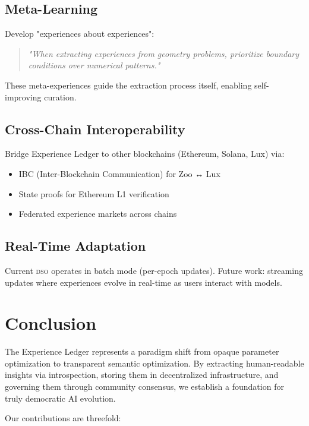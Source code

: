 \documentclass[11pt,letterpaper]{article}
\newcommand{\DSO}{\textsc{dso}}
\begin{document}
\subsection{Meta-Learning}

Develop "experiences about experiences":
\begin{quote}
\textit{"When extracting experiences from geometry problems, prioritize boundary conditions over numerical patterns."}
\end{quote}

These meta-experiences guide the extraction process itself, enabling self-improving curation.

\subsection{Cross-Chain Interoperability}

Bridge Experience Ledger to other blockchains (Ethereum, Solana, Lux) via:
\begin{itemize}
    \item IBC (Inter-Blockchain Communication) for Zoo ↔ Lux
    \item State proofs for Ethereum L1 verification
    \item Federated experience markets across chains
\end{itemize}

\subsection{Real-Time Adaptation}

Current \DSO{} operates in batch mode (per-epoch updates). Future work: streaming updates where experiences evolve in real-time as users interact with models.

\section{Conclusion}

The Experience Ledger represents a paradigm shift from opaque parameter optimization to transparent semantic optimization. By extracting human-readable insights via introspection, storing them in decentralized infrastructure, and governing them through community consensus, we establish a foundation for truly democratic AI evolution.

Our contributions are threefold:
\end{document}
